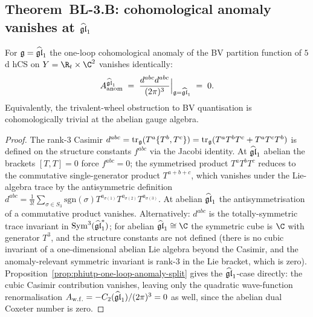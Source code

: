 \subsection*{Theorem~BL-3.B: cohomological anomaly vanishes at $\widehat{\mathfrak{gl}}_1$}

\begin{theorem}
\label{thm:bl-bv-c3-anomaly-vanishing}
\ClaimStatusProvedHere
For $\mathfrak{g} = \widehat{\mathfrak{gl}}_1$ the one-loop cohomological anomaly of the BV
partition function of $5$d hCS on $Y = \R_t\times\C^2$ vanishes
identically:
\[
  A_{\mathrm{anom}}^{\widehat{\mathfrak{gl}}_1}
  \;=\; \frac{d^{abc}d^{abc}}{(2\pi)^3}\Big|_{\mathfrak{g} = \widehat{\mathfrak{gl}}_1}
  \;=\; 0.
\]
Equivalently, the trivalent-wheel obstruction to BV quantisation
is cohomologically trivial at the abelian gauge algebra.
\end{theorem}

\begin{proof}
The rank-$3$ Casimir $d^{abc} = \mathrm{tr}_{\mathfrak{g}}(T^a\{T^b, T^c\})
= \mathrm{tr}_{\mathfrak{g}}(T^a T^b T^c + T^a T^c T^b)$
is defined on the structure constants $f^{abc}$ via the Jacobi
identity. At $\widehat{\mathfrak{gl}}_1$ abelian the brackets $[T, T] = 0$ force
$f^{abc} = 0$; the symmetrised product $T^a T^b T^c$ reduces to the
commutative single-generator product $T^{a+b+c}$, which vanishes
under the Lie-algebra trace by the antisymmetric definition
$d^{abc} = \tfrac{1}{3!}\sum_{\sigma\in S_3}\mathrm{sgn}(\sigma)
T^{a_{\sigma(1)}}T^{a_{\sigma(2)}}T^{a_{\sigma(3)}}$. At abelian
$\widehat{\mathfrak{gl}}_1$ the antisymmetrisation of a commutative product vanishes.
Alternatively: $d^{abc}$ is the totally-symmetric trace invariant
in $\mathrm{Sym}^3(\widehat{\mathfrak{gl}}_1^*)$; for abelian $\ghat \cong \C$ the
symmetric cube is $\C$ with generator $T^3$, and the structure
constants are not defined (there is no cubic invariant of a
one-dimensional abelian Lie algebra beyond the Casimir, and the
anomaly-relevant symmetric invariant is rank-$3$ in the Lie bracket,
which is zero).
Proposition~\ref{prop:phiutp-one-loop-anomaly-split} gives the
$\widehat{\mathfrak{gl}}_1$-case directly: the cubic Casimir contribution vanishes,
leaving only the quadratic wave-function renormalisation
$A_{\mathrm{w.f.}} = -C_2(\widehat{\mathfrak{gl}}_1)/(2\pi)^3 = 0$ as well, since the
abelian dual Coxeter number is zero.
\end{proof}

